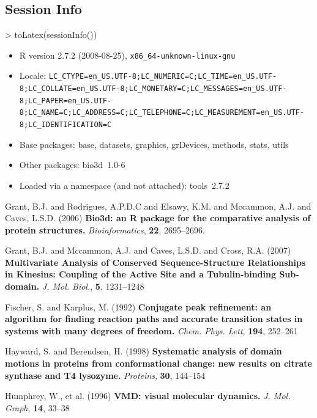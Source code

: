 \documentclass[a4paper]{article}
\begin{document}
\subsection*{Session Info}
\begin{Schunk}
\begin{Sinput}
> toLatex(sessionInfo())
\end{Sinput}
\begin{Soutput}
\begin{itemize}
  \item R version 2.7.2 (2008-08-25), \verb|x86_64-unknown-linux-gnu|
  \item Locale: \verb|LC_CTYPE=en_US.UTF-8;LC_NUMERIC=C;LC_TIME=en_US.UTF-8;LC_COLLATE=en_US.UTF-8;LC_MONETARY=C;LC_MESSAGES=en_US.UTF-8;LC_PAPER=en_US.UTF-8;LC_NAME=C;LC_ADDRESS=C;LC_TELEPHONE=C;LC_MEASUREMENT=en_US.UTF-8;LC_IDENTIFICATION=C|
  \item Base packages: base, datasets, graphics, grDevices, methods,
    stats, utils
  \item Other packages: bio3d~1.0-6
  \item Loaded via a namespace (and not attached): tools~2.7.2
\end{itemize}
\end{Soutput}
\end{Schunk}

\begin{thebibliography}{9}


Grant, B.J. and Rodrigues, A.P.D.C and Elsawy, K.M. and Mccammon, A.J. and Caves, L.S.D. (2006)
\textbf{Bio3d: an R package for the comparative analysis of protein structures.}
\emph{Bioinformatics},
\textbf{22}, 2695--2696.


Grant, B.J. and Mccammon, A.J. and Caves, L.S.D. and Cross, R.A. (2007)
\textbf{Multivariate Analysis of Conserved Sequence-Structure Relationships in Kinesins: Coupling of the Active Site and a Tubulin-binding Sub-domain.}
\emph{J. Mol. Biol.},
\textbf{5}, 1231--1248


Fischer, S. and Karplus, M. (1992) 
\textbf{Conjugate peak refinement: an algorithm for finding reaction paths and accurate transition states in systems with many degrees of freedom.}
\emph{Chem. Phys. Lett}, \textbf{194}, 252--261


Hayward, S. and Berendsen, H. (1998) 
\textbf{Systematic analysis of domain motions in proteins from conformational change: new results on citrate synthase and T4 lysozyme.}
\emph{Proteins}, \textbf{30}, 144--154


Humphrey, W., et al. (1996) 
\textbf{VMD: visual molecular dynamics.}
\emph{J. Mol. Graph}, \textbf{14}, 33--38



\end{thebibliography}
\end{document}
